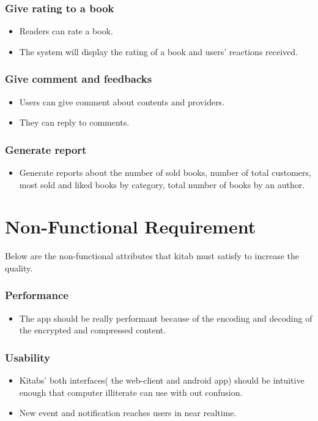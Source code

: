 	\subsubsection{Give rating to a book}
	\begin{itemize}
		\item Readers can rate a book.
		\item The system will display the rating of a book and users’ reactions received.
	\end{itemize}

	\subsubsection{Give comment and feedbacks}
	\begin{itemize}
		\item Users can give comment about contents and providers.
		\item They can reply to comments.
	\end{itemize}

	\subsubsection{Generate report}
	\begin{itemize}
		\item Generate reports about the number of sold books, number of total customers, most sold and liked books by category, total number of books by an author.
	\end{itemize}

\section{Non-Functional Requirement}

Below are the non-functional attributes that kitab must satisfy to increase the quality.

	\subsubsection{Performance}
	\begin{itemize}
		\item The app should be really performant because of the encoding and decoding of the encrypted and compressed content. 
	\end{itemize}

	\subsubsection{Usability}
	\begin{itemize}
		\item Kitabs' both interfaces( the web-client and android app) should be intuitive enough that computer illiterate can use with out confusion.
		\item New event and notification reaches users in near realtime.
	\end{itemize}

